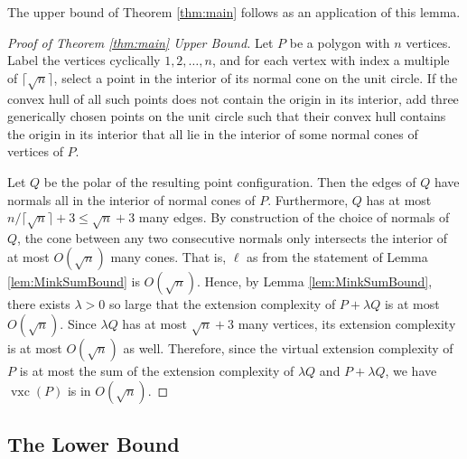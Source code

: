 \documentclass[centering,11pt,reqno]{amsart}
\theoremstyle{definition}
\DeclareMathOperator{\vxc}{vxc}
\begin{document}
The upper bound of Theorem \ref{thm:main} follows as an application of this lemma.

\begin{proof}[Proof of Theorem \ref{thm:main} Upper Bound]
Let $P$ be a polygon with $n$ vertices. Label the vertices cyclically $1,2, \dots, n$, and for each vertex with index a multiple of $\lceil \sqrt{n} \rceil$, select a point in the interior of its normal cone on the unit circle. If the convex hull of all such points does not contain the origin in its interior, add three generically chosen points on the unit circle such that their convex hull contains the origin in its interior that all lie in the interior of some normal cones of vertices of $P$. 

Let $Q$ be the polar of the resulting point configuration. Then the edges of $Q$ have normals all in the interior of normal cones of $P$. Furthermore, $Q$ has at most $n/\lceil \sqrt{n}\rceil + 3 \leq \sqrt{n} +3$ many edges. By construction of the choice of normals of $Q$, the cone between any two consecutive normals only intersects the interior of at most $O(\sqrt{n})$ many cones. That is, $\ell$ as from the statement of Lemma \ref{lem:MinkSumBound} is $O(\sqrt{n})$.  Hence, by Lemma \ref{lem:MinkSumBound}, there exists $\lambda > 0$ so large that the extension complexity of $P + \lambda Q$ is at most $ O(\sqrt{n})$. Since $\lambda Q$ has at most $\sqrt{n} + 3$ many vertices, its extension complexity is at most $O(\sqrt{n})$ as well. Therefore, since the virtual extension complexity of $P$ is at most the sum of the extension complexity of $\lambda Q$ and $P + \lambda Q$, we have $\vxc(P)$ is in $O(\sqrt{n})$.
\end{proof}

\subsection{The Lower Bound}
\end{document}
